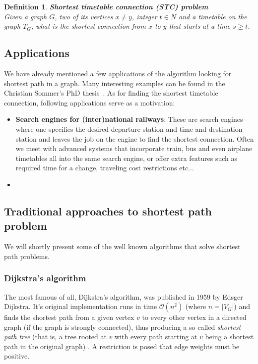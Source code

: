\documentclass[a4paper]{article}
\newenvironment{itemizesp}
{
    \begin{itemize}
}
{
    \end{itemize}
}
\newtheorem{definition}{Definition}
\begin{document}

    \begin{definition}
        \textbf{Shortest timetable connection (STC) problem} \\
        Given a graph $G$, two of its vertices $x \neq y$, integer $t \in N$ and a timetable on the graph $T_{G}$, what is the shortest \emph{connection} from $x$ to $y$ that \emph{starts} at a \emph{time} $s \geq t$.
    \end{definition}


        \subsection{Applications}
        We have already mentioned a few applications of the algorithm looking for shortest path in a graph. Many interesting examples can be found in the Christian Sommer's PhD thesis~\cite{sommerthesis10}. As for finding the shortest timetable connection, following applications serve as a motivation: \\

        \begin{itemizesp}
            \item \textbf{Search engines for (inter)national railways}: These are search engines where one specifies the desired departure station and time and destination station and leaves the job on the engine to find the shortest connection. Often we meet with advanced systems that incorporate train, bus and even airplane timetables all into the same search engine, or offer extra features such as required time for a change, traveling cost restrictions etc...
            \item %
        \end{itemizesp}

        \subsection{Traditional approaches to shortest path problem}
        We will shortly present some of the well known algorithms that solve shortest path problems.

            \subsubsection{Dijkstra's algorithm}
            The most famous of all, Dijkstra's algorithm, was published in 1959 by Edsger Dijkstra. It's original implementation runs in time $\mathcal{O}(n^2)$ (where $n=|V_{G}|$) and finds the shortest path from a given vertex $v$ to every other vertex in a directed graph (if the graph is strongly connected), thus producing a so called \emph{shortest path tree} (that is, a tree rooted at $v$ with every path starting at $v$ being a shortest path in the original graph) . A restriction is posed that edge weights must be positive.
\end{document}
